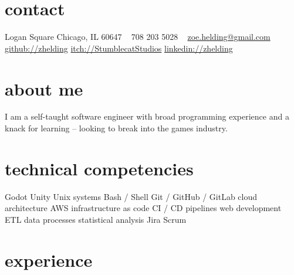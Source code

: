 \documentclass[letterpaper]{friggeri-cv} %
\begin{document}


\begin{aside} %
\section{contact}
Logan Square
Chicago, IL 60647
~
708 203 5028
~
\href{mailto:zoe.helding@gmail.com}{zoe.helding@gmail.com}
\href{https://github.com/zhelding}{github://zhelding}
\href{https://stumblecatstudios.itch.io/}{itch://StumblecatStudios}
\href{https://www.linkedin.com/in/zhelding/}{linkedin://zhelding}
\section{about me}
I am a self-taught software engineer with broad programming experience and a knack for learning -- looking to break into the games industry.
\section{technical competencies}
Godot
Unity
Unix systems
Bash / Shell
Git / GitHub / GitLab
cloud architecture
AWS
infrastructure as code
CI / CD pipelines
web development
ETL data processes
statistical analysis
Jira
Scrum
\end{aside}


\section{experience}
\end{document}
